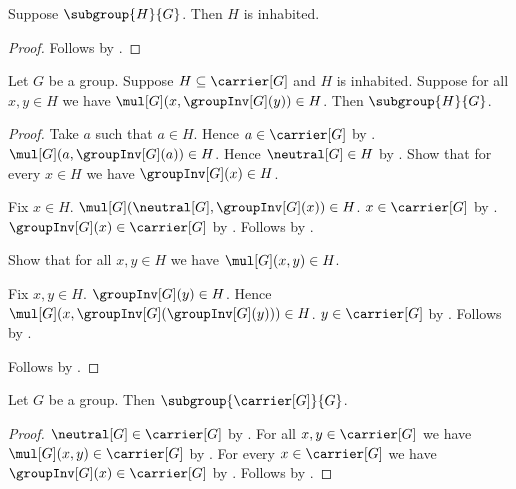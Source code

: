 \begin{corollary}\label{subgroup_inhabited}
    Suppose $\subgroup{H}{G}$.
    Then $H$ is inhabited.
\end{corollary}
\begin{proof}
    Follows by .
\end{proof}

\begin{theorem}\label{subgroup_difference_criterion}
    Let $G$ be a group.
    Suppose $H\subseteq\carrier[G]$ and $H$ is inhabited.
    Suppose for all $x,y\in H$ we have
        $\mul[G](x,\groupInv[G](y))\in H$.
    Then $\subgroup{H}{G}$.
\end{theorem}
\begin{proof}
    Take $a$ such that $a\in H$.
    Hence $a\in\carrier[G]$ by .
    $\mul[G](a,\groupInv[G](a))\in H$.
    Hence $\neutral[G]\in H$ by .
    Show that for every $x\in H$ we have $\groupInv[G](x)\in H$.
    \begin{subproof}
        Fix $x\in H$.
        $\mul[G](\neutral[G],\groupInv[G](x))\in H$.
        $x\in\carrier[G]$ by .
        $\groupInv[G](x)\in\carrier[G]$ by
            .
        Follows by
            .
    \end{subproof}
    Show that for all $x,y\in H$ we have $\mul[G](x,y)\in H$.
    \begin{subproof}
        Fix $x,y\in H$.
        $\groupInv[G](y)\in H$.
        Hence
            $\mul[G](x,\groupInv[G](\groupInv[G](y)))\in H$.
        $y\in\carrier[G]$ by .
        Follows by .
    \end{subproof}
    Follows by .
\end{proof}

\begin{proposition}\label{full_carrier_subgroup}
    Let $G$ be a group.
    Then $\subgroup{\carrier[G]}{G}$.
\end{proposition}
\begin{proof}
    $\neutral[G]\in\carrier[G]$ by .
    For all $x,y\in\carrier[G]$ we have
        $\mul[G](x,y)\in\carrier[G]$ by
        .
    For every $x\in\carrier[G]$ we have
        $\groupInv[G](x)\in\carrier[G]$ by
        .
    Follows by .
\end{proof}

